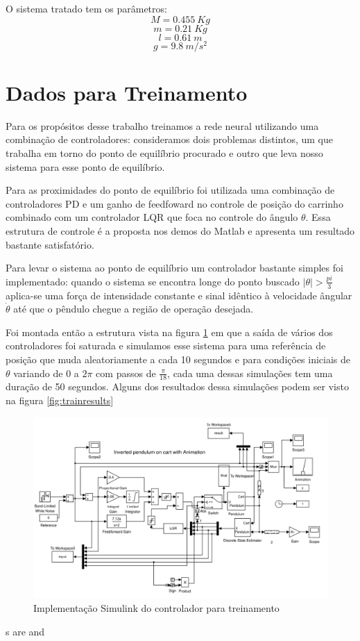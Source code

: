 \documentclass{article}
\begin{document}
O sistema tratado tem os parâmetros:
\begin{equation}
	M = 0.455\ Kg
\end{equation}
\begin{equation}
	m = 0.21\ Kg
\end{equation}
\begin{equation}
	l = 0.61\ m
\end{equation}
\begin{equation}
	g = 9.8\ m/s^2
\end{equation}
\section{Dados para Treinamento}
Para os propósitos desse trabalho treinamos a rede neural utilizando uma combinação de controladores: consideramos dois problemas distintos, um que trabalha em torno do ponto de equilíbrio procurado e outro que leva nosso sistema para esse ponto de equilíbrio. 

Para as proximidades do ponto de equilíbrio foi utilizada uma combinação de controladores PD e um ganho de feedfoward no controle de posição do carrinho combinado com um controlador LQR que foca no controle do ângulo $\theta$. Essa estrutura de controle é a proposta nos demos do Matlab e apresenta um resultado bastante satisfatório.

Para levar o sistema ao ponto de equilíbrio um controlador bastante simples foi implementado: quando o sistema se encontra longe do ponto buscado $|\theta| > \frac{pi}{3}$ aplica-se uma força de intensidade constante e sinal idêntico à velocidade ângular $\dot{\theta}$ até que o pêndulo chegue a região de operação desejada.

Foi montada então a estrutura vista na figura \ref{fig:train} em que a saída de vários dos controladores foi saturada e simulamos esse sistema para uma referência de posição que muda aleatoriamente a cada 10 segundos e para condições iniciais de $\theta$ variando de $0$ a $2\pi$ com passos de $\frac{\pi}{18}$, cada uma dessas simulações tem uma duração de 50 segundos. Alguns dos resultados dessa simulações podem ser visto na figura \ref{fig:trainresults}

\begin{figure}[H]
	\centering
	\includegraphics[width=0.7\linewidth]{train}
	\caption{Implementação Simulink do controlador para treinamento}
	\label{fig:train}
\end{figure}s are \quad and \qqua
\end{document}
